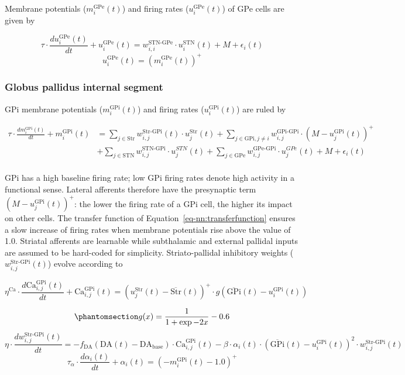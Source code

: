 \documentclass[
  11pt,
  a4paper,
]{scrbook}
\begin{document}
Membrane potentials (\(m_i^\text{GPe}(t)\)) and firing rates
(\(u_i^\text{GPe}(t)\)) of GPe cells are given by

\[
 \tau \cdot \frac{d u_i^\text{GPe}(t)}{dt} + u_i^\text{GPe}(t) = w_{i,i}^\text{STN-GPe} \cdot u_i^\text{STN}(t) + M + \epsilon_i(t)
\] \[
 u_i^\text{GPe}(t) = (m_i^\text{GPe}(t))^+
\]

\subsubsection*{Globus pallidus internal
segment}\label{globus-pallidus-internal-segment-1}

GPi membrane potentials (\(m_i^\text{GPi}(t)\)) and firing rates
(\(u_i^\text{GPi}(t)\)) are ruled by

\[
\begin{aligned}
    \tau \cdot \frac{d m_i^\text{GPi}(t)}{dt} + m_i^\text{GPi}(t) &= \sum_{j \in \text{Str}} w_{i,j}^\text{Str-GPi}(t) \cdot u_j^\text{Str}(t) + \sum_{j \in \text{GPi}, j \neq i } w_{i,j}^\text{GPi-GPi} \cdot (M - u_j^\text{GPi}(t))^+ \\
    &+ \sum_{j \in \text{STN}} w_{i,j}^\text{STN-GPi} \cdot u_j^{STN}(t)+ \sum_{j \in \text{GPe}} w_{i,j}^\text{GPe-GPi} \cdot u_j^{GPe}(t) + M + \epsilon_i(t) \\
\end{aligned}
\]

GPi has a high baseline firing rate; low GPi firing rates denote high
activity in a functional sense. Lateral afferents therefore have the
presynaptic term \((M - u_j^\text{GPi}(t))^+\): the lower the firing
rate of a GPi cell, the higher its impact on other cells. The transfer
function of Equation~\ref{eq-nn:transferfunction} ensures a slow
increase of firing rates when membrane potentials rise above the value
of 1.0. Striatal afferents are learnable while subthalamic and external
pallidal inputs are assumed to be hard-coded for simplicity.
Striato-pallidal inhibitory weights (\(w_{i,j}^\text{Str-GPi}(t)\))
evolve according to

\[
  \eta^\text{Ca} \cdot \frac{d \text{Ca}_{i,j}^\text{GPi}(t)}{dt} + \text{Ca}_{i,j}^\text{GPi}(t) = (u_j^\text{Str}(t) - \overline{\text{Str}}(t))^+ \cdot g(\overline{\text{GPi}}(t) - u_i^\text{GPi}(t))
\]

\begin{equation}\phantomsection\label{eq-nn:transferfunction}{
 g(x)= \frac{1}{1+\exp-2x} - 0.6
}\end{equation} \[
  \eta \cdot \frac{d w_{i,j}^\text{Str-GPi}(t)}{dt} = - f_\text{DA}(\text{DA}(t)-\text{DA}_\text{base}) \cdot \text{Ca}_{i,j}^\text{GPi}(t) - \beta \cdot  \alpha_i(t) \cdot (\overline{\text{GPi}}(t) - u_i^\text{GPi}(t))^2 \cdot w_{i,j}^\text{Str-GPi}(t)
\] \[
 \tau_\alpha  \cdot \frac{d \alpha_i(t)}{dt} + \alpha_i(t) = (-m_i^\text{GPi}(t) - 1.0)^+
\]
\end{document}
